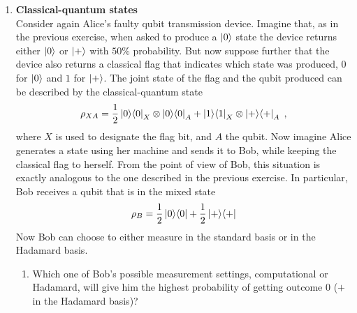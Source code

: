 \documentclass[12pt]{article}
\begin{document}
\begin{enumerate}
\item {\bf Classical-quantum states}\\
Consider again Alice's faulty qubit transmission device. Imagine that, as in the previous exercise, when asked to produce a $\ket{0}$ state the device returns either $\ket{0}$ or $\ket{+}$ with $50\%$ probability. But now suppose further that the device also returns a classical flag that indicates which state was produced, $0$ for $\ket{0}$ and $1$ for $\ket{+}$. The joint state of the flag and the qubit produced can be described by the classical-quantum state
\begin{equation}
\rho_{XA} = \frac{1}{2}\ket{0}\!\bra{0}_X \otimes\ket{0}\!\bra{0}_A + \ket{1}\!\bra{1}_X\otimes \ket{+}\!\bra{+}_A\;,
\end{equation}
where $X$ is used to designate the flag bit, and $A$ the qubit. 
Now imagine Alice generates a state using her machine and sends it to Bob, while keeping the classical flag to herself. From the point of view of Bob, this situation is exactly analogous to the one described in the previous exercise. In particular, Bob receives a qubit that is in the mixed state
\begin{equation}
\rho_B = \frac{1}{2}\ket{0}\!\bra{0}+ \frac{1}{2}\ket{+}\!\bra{+}
\end{equation}
Now Bob can choose to either measure in the standard basis or in the Hadamard basis.
\begin{enumerate}
\item Which one of Bob's possible measurement settings, computational or Hadamard, will give him the highest probability of getting outcome $0$ ($+$ in the Hadamard basis)?
\end{enumerate}

\end{enumerate}
\end{document}
